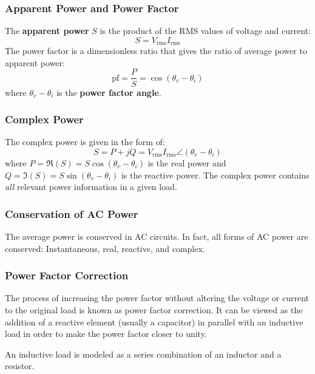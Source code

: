\documentclass{article}
\begin{document}
\subsubsection{Apparent Power and Power Factor}
The \textbf{apparent power} $S$ is the product of the RMS values of voltage and current:
\begin{equation}
    S = V_\text{rms}I_\text{rms}
\end{equation}
The power factor is a dimensionless ratio that gives the ratio of average power to apparent power:
\begin{equation}
    \text{pf} = \frac{P}{S} = \cos(\theta_v - \theta_i)
\end{equation}
where $\theta_v-\theta_i$ is the \textbf{power factor angle}.
\subsubsection{Complex Power}
The complex power is given in the form of:
\begin{equation}
    S = P + jQ = V_\text{rms}I_\text{rms} \angle (\theta_v-\theta_i)
\end{equation}
where $P = \Re(S) = S\cos(\theta_v-\theta_i)$ is the real power and $Q=\Im(S)=S\sin(\theta_v-\theta_i)$ is the reactive power. The complex power contains \textit{all} relevant power information in a given load.
\subsubsection{Conservation of AC Power}
\begin{theorem}
    The average power is conserved in AC circuits. In fact, all forms of AC power are conserved: Instantaneous, real, reactive, and complex.
\end{theorem}
\subsubsection{Power Factor Correction}
The process of increasing the power factor without altering the voltage or current to the original load is known as power factor correction. It can be viewed as the addition of a reactive element (usually a capacitor) in parallel with an inductive load in order to make the power factor closer to unity.

An inductive load is modeled as a series combination of an inductor and a resistor.
\end{document}
